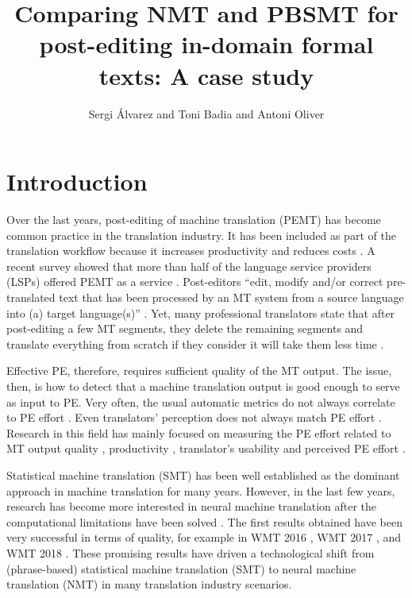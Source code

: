 \documentclass[output=paper]{langsci/langscibook}
\author{Sergi Álvarez\affiliation{Universitat Pompeu Fabra} and Toni Badia\affiliation{Universitat Pompeu Fabra} and Antoni Oliver\affiliation{Universitat Oberta de Catalunya}}
\title[Comparing NMT and PBSMT for post-editing in-domain formal texts]
      {Comparing NMT and PBSMT for post-editing in-domain formal texts:\newlineCover{} A case study}
\begin{document}
\maketitle

\section{Introduction}
Over the last years, post-editing of machine translation (PEMT) has become common practice in the translation industry. It has been included as part of the translation workflow because it increases productivity and reduces costs \citep{Guerberof2009a}. A recent survey showed that more than half of the language service providers (LSPs) offered PEMT as a service \citep{Lommel2016EuropesMT}. Post-editors “edit, modify and/or correct pre-translated text that has been processed by an MT system from a source language into (a) target language(s)” \citep{Allen2003}. Yet, many professional translators state that after post-editing a few MT segments, they delete the remaining segments and translate everything from scratch if they consider it will take them less time \citep{ParraEscartin2015}.

Effective PE, therefore, requires sufficient quality of the MT output. The issue, then, is how to detect that a machine translation output is good enough to serve as input to PE. Very often, the usual automatic metrics do not always correlate to PE effort \citep{koponen2016machine}. Even translators' perception does not always match PE effort \citep{koponen2012comparing,Moorkens2018c}. Research in this field has mainly focused on measuring the PE effort related to MT output quality \citep{Guerberof2009a,Guerberof2009,Specia2011a,Specia2010}, productivity \citep{OBrien2011,ParraEscartin2015,Plitt2010,Sanchez-Torron}, translator’s usability \citep{Castilho2014,Moorkens2013} and perceived PE effort \citep{moorkens_correlations_2015}. 
                            
Statistical machine translation (SMT) has been well established as the dominant approach in machine translation for many years. However, in the last few years, research has become more interested in neural machine translation after the computational limitations have been solved \citep{Bahdanau2014NeuralTranslate,Cho2014OnApproaches}. The first results obtained have been very successful in terms of quality, for example in WMT 2016 \citep{Bojar2016}, WMT 2017 \citep{Bojar2017}, and WMT 2018 \citep{Bojar}. These promising results have driven a technological shift from (phrase-based) statistical machine translation (SMT) to neural machine translation (NMT) in many translation industry scenarios.
\end{document}
